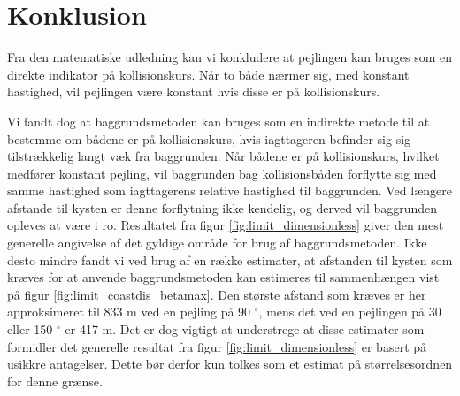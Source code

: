 \documentclass[%
 reprint,
nofootinbib,
aps,
]{revtex4-1}
\begin{document}
\section{Konklusion}
Fra den matematiske udledning kan vi konkludere at pejlingen kan bruges som en direkte indikator på kollisionskurs. Når to både nærmer sig, med konstant hastighed, vil pejlingen være konstant hvis disse er på kollisionskurs. \par
Vi fandt dog at baggrundsmetoden kan bruges som en indirekte metode til at bestemme om bådene er på kollisionskurs, hvis iagttageren befinder sig sig tilstrækkelig langt væk fra baggrunden. Når bådene er på kollisionskurs, hvilket medfører konstant pejling, vil baggrunden bag kollisionsbåden forflytte sig med samme hastighed som iagttagerens relative hastighed til baggrunden. Ved længere afstande til kysten er denne forflytning ikke kendelig, og derved vil baggrunden opleves at være i ro. Resultatet fra figur \ref{fig:limit_dimensionless} giver den mest generelle angivelse af det gyldige område for brug af baggrundsmetoden. Ikke desto mindre fandt vi ved brug af en række estimater, at afstanden til kysten som kræves for at anvende baggrundsmetoden kan estimeres til sammenhængen vist på figur \ref{fig:limit_coastdis_betamax}. Den største afstand som kræves er her approksimeret til 833 m ved en pejling på 90 $^{\circ}$, mens det ved en pejlingen på 30 eller 150 $^{\circ}$ er 417 m. Det er dog vigtigt at understrege at disse estimater som formidler det generelle resultat fra figur \ref{fig:limit_dimensionless} er basert på usikkre antagelser. Dette bør derfor kun tolkes som et estimat på størrelsesordnen for denne grænse.
\end{document}
